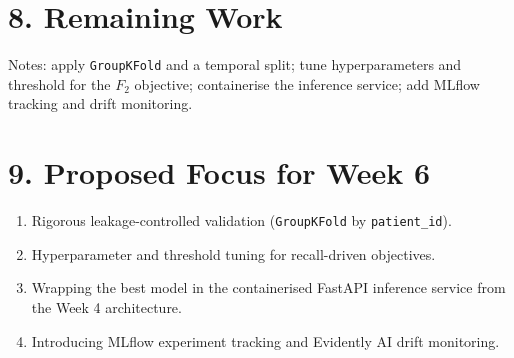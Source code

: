 \documentclass[11pt,a4paper]{article}
\begin{document}
\section*{8. Remaining Work}
Notes: apply \texttt{GroupKFold} and a temporal split; tune hyperparameters and threshold for the
$F_2$ objective; containerise the inference service; add MLflow tracking and drift monitoring.

\section*{9. Proposed Focus for Week 6}
\begin{enumerate}
    \item Rigorous leakage-controlled validation (\texttt{GroupKFold} by \texttt{patient\_id}).
    \item Hyperparameter and threshold tuning for recall-driven objectives.
    \item Wrapping the best model in the containerised FastAPI inference service from the Week 4
          architecture.
    \item Introducing MLflow experiment tracking and Evidently AI drift monitoring.
\end{enumerate}
\end{document}
